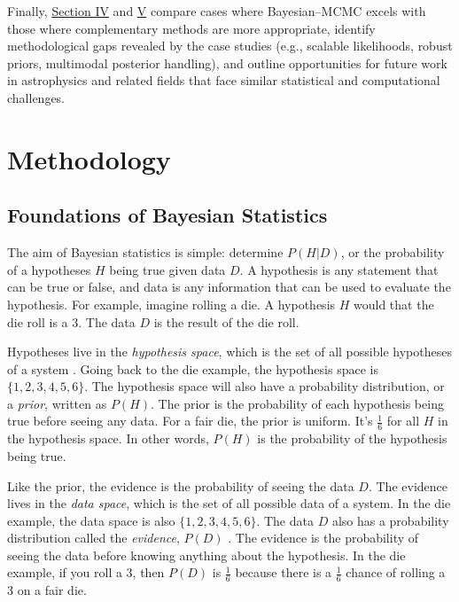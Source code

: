\documentclass[preprint2,longauthor]{aastex631}
\begin{document}
Finally, \hyperref[placeholder]{Section IV} and \hyperref[placeholder]{V} compare cases where Bayesian–MCMC excels with those where complementary methods are more appropriate, identify methodological gaps revealed by the case studies (e.g., scalable likelihoods, robust priors, multimodal posterior handling), and outline opportunities for future work in astrophysics and related fields that face similar statistical and computational challenges.

\section{Methodology}
\label{sec:Methodology}

\subsection{Foundations of Bayesian Statistics} %
The aim of Bayesian statistics is simple: determine $P(H|D)$, or the probability of a hypotheses $H$ being true given data $D$. A hypothesis is any statement that can be true or false, and data is any information that can be used to evaluate the hypothesis. For example, imagine rolling a die. A hypothesis $H$ would that the die roll is a 3. The data $D$ is the result of the die roll.

Hypotheses live in the \textit{hypothesis space}, which is the set of all possible hypotheses of a system \citep{brewer1BayesianInference2018}. Going back to the die example, the hypothesis space is $\{1,2,3,4,5,6\}$. The hypothesis space will also have a probability distribution, or a \textit{prior}, written as $P(H)$. The prior is the probability of each hypothesis being true before seeing any data. For a fair die, the prior is uniform. It's $\frac{1}{6}$ for all $H$ in the hypothesis space. In other words, $P(H)$ is the probability of the hypothesis being true.

Like the prior, the evidence is the probability of seeing the data $D$. The evidence lives in the \textit{data space}, which is the set of all possible data of a system. In the die example, the data space is also $\{1,2,3,4,5,6\}$. The data $D$ also has a probability distribution called the \textit{evidence}, $P(D)$ \citep{brewer1BayesianInference2018}. The evidence is the probability of seeing the data before knowing anything about the hypothesis. In the die example, if you roll a 3, then $P(D)$ is $\frac{1}{6}$ because there is a $\frac{1}{6}$ chance of rolling a 3 on a fair die.
\end{document}
